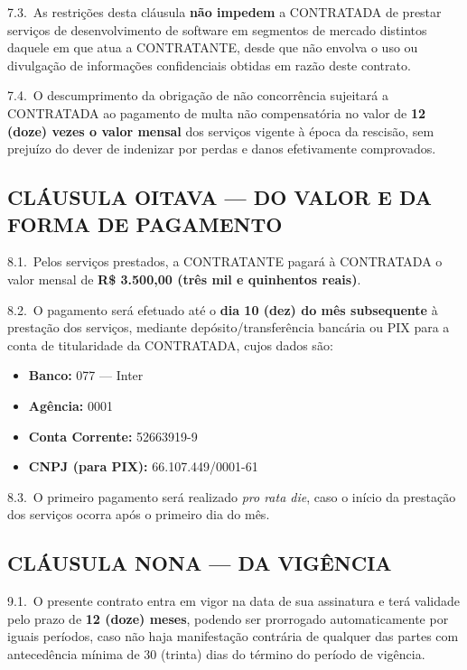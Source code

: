 \documentclass[11pt, a4paper]{article}
\begin{document}
7.3.\ As restrições desta cláusula \textbf{não impedem} a CONTRATADA de prestar serviços de desenvolvimento de software em segmentos de mercado distintos daquele em que atua a CONTRATANTE, desde que não envolva o uso ou divulgação de informações confidenciais obtidas em razão deste contrato.

7.4.\ O descumprimento da obrigação de não concorrência sujeitará a CONTRATADA ao pagamento de multa não compensatória no valor de \textbf{12 (doze) vezes o valor mensal} dos serviços vigente à época da rescisão, sem prejuízo do dever de indenizar por perdas e danos efetivamente comprovados.

\subsection{CLÁUSULA OITAVA — DO VALOR E DA FORMA DE PAGAMENTO}

8.1.\ Pelos serviços prestados, a CONTRATANTE pagará à CONTRATADA o valor mensal de \textbf{R\$ 3.500,00 (três mil e quinhentos reais)}.

8.2.\ O pagamento será efetuado até o \textbf{dia 10 (dez) do mês subsequente} à prestação dos serviços, mediante depósito/transferência bancária ou PIX para a conta de titularidade da CONTRATADA, cujos dados são:

\begin{itemize}[label=\textcolor{primaryColor}{$\bullet$}, leftmargin=1.8em]
    \item \textbf{Banco:} 077 — Inter
    \item \textbf{Agência:} 0001
    \item \textbf{Conta Corrente:} 52663919-9
    \item \textbf{CNPJ (para PIX):} 66.107.449/0001-61
\end{itemize}

8.3.\ O primeiro pagamento será realizado \textit{pro rata die}, caso o início da prestação dos serviços ocorra após o primeiro dia do mês.

\subsection{CLÁUSULA NONA — DA VIGÊNCIA}

9.1.\ O presente contrato entra em vigor na data de sua assinatura e terá validade pelo prazo de \textbf{12 (doze) meses}, podendo ser prorrogado automaticamente por iguais períodos, caso não haja manifestação contrária de qualquer das partes com antecedência mínima de 30 (trinta) dias do término do período de vigência.
\end{document}

